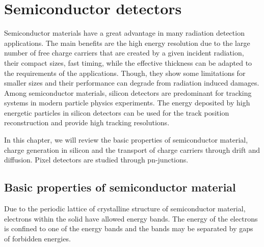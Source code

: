 \chapter{Semiconductor detectors}
\label{sec:SiliconTheory}

Semiconductor materials have a great advantage in many radiation
detection applications. The main benefits are the high energy
resolution due to the large number of free charge carriers that are
created by a given incident radiation, their compact sizes, fast
timing, while the effective thickness can be adapted to the
requirements of the applications. Though, they show some limitations
for smaller sizes and their performance can degrade from radiation
induced damages. Among semiconductor materials, silicon detectors are
predominant for tracking systems in modern particle physics
experiments. The energy deposited by high energetic particles in
silicon detectors can be used for the track position reconstruction
and provide high tracking resolutions.

In this chapter, we will review the basic properties of semiconductor
material, charge generation in silicon and the transport of charge
carriers through drift and diffusion. Pixel detectors are studied
through pn-junctions. 

\section{Basic properties of semiconductor material}
Due to the periodic lattice of crystalline structure of semiconductor
material, electrons within the solid have allowed energy bands. The
energy of the electrons is confined to one of the energy bands and the
bands may be separated by gaps of forbidden energies.

